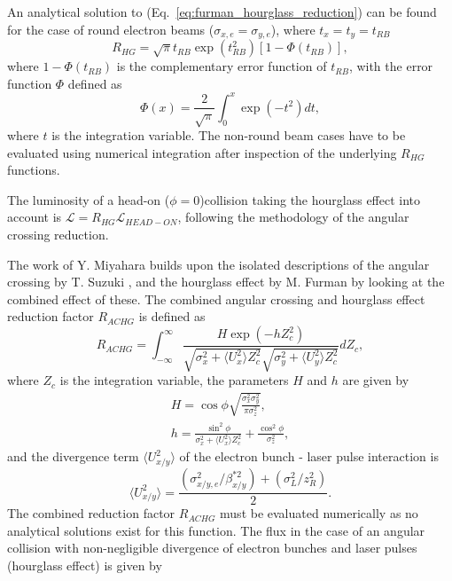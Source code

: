 \documentclass[../main.tex]{subfiles}
\begin{document}
An analytical solution to (Eq.~\ref{eq:furman_hourglass_reduction}) can be found for the case of round electron beams ($\sigma_{x,e}=\sigma_{y,e}$), where $t_{x}=t_{y}=t_{RB}$
\begin{equation}
R_{HG} = \sqrt{\pi}t_{RB}\exp\left(t_{RB}^{2}\right)\left[1-\Phi\left(t_{RB}\right)\right],
\label{eq:furman_hourglass_reduction_analytical}    
\end{equation}
where $1-\Phi\left(t_{RB}\right)$ is the complementary error function of $t_{RB}$, with the error function $\Phi$ defined as
\begin{equation}
\Phi\left(x\right) = \frac{2}{\sqrt{\pi}}\int_{0}^{x}\exp\left(-t^{2}\right)dt,
\label{eq:error_function}    
\end{equation}
where $t$ is the integration variable. The non-round beam cases have to be evaluated using numerical integration after inspection of the underlying $R_{HG}$ functions.

The luminosity of a head-on ($\phi = 0$)collision taking the hourglass effect into account is $\mathcal{L} = R_{HG}\mathcal{L}_{HEAD-ON}$, following the methodology of the angular crossing reduction.

The work of Y. Miyahara \cite{miyahara2008luminosity} builds upon the isolated descriptions of the angular crossing by T. Suzuki \cite{suzuki1976general}, and the hourglass effect by M. Furman \cite{furman1991hourglas} by looking at the combined effect of these. The combined angular crossing and hourglass effect reduction factor $R_{ACHG}$ is defined as
\begin{equation}
R_{ACHG} = \int_{-\infty}^{\infty}\frac{H\exp\left(-hZ_{c}^{2}\right)}{\sqrt{\sigma_{x}^{2}+\langle U_{x}^2\rangle Z_{c}^{2}}\sqrt{\sigma_{y}^{2}+\langle U_{y}^{2}\rangle Z_{c}^{2}}}dZ_{c},
\label{eq:miyahara_combined_reduction}    
\end{equation}
where $Z_{c}$ is the integration variable, the parameters $H$ and $h$ are given by
\begin{gather}
H = \cos\phi\sqrt{\frac{\sigma_{x}^{2}\sigma_{y}^{2}}{\pi\sigma_{z}^{2}}},
\label{eq:miyahara_H_parameter} \\
h = \frac{\sin^{2}\phi}{\sigma_{x}^{2}+\langle U_{x}^{2}\rangle Z_{c}^{2}}+\frac{\cos^{2}\phi}{\sigma_{z}^{2}},
\label{eq:miyahara_h_parameter}
\end{gather}
and the divergence term $\langle U_{x/y}^{2}\rangle$ of the electron bunch - laser pulse interaction is
\begin{equation}
\langle U_{x/y}^{2}\rangle = \frac{\left(\sigma_{x/y,e}^{2}/\beta_{x/y}^{*2}\right)+\left(\sigma_{L}^{2}/z_{R}^{2}\right)}{2}.    
\end{equation}
The combined reduction factor $R_{ACHG}$ must be evaluated numerically as no analytical solutions exist for this function. The flux in the case of an angular collision with non-negligible divergence of electron bunches and laser pulses (hourglass effect) is given by
\end{document}
